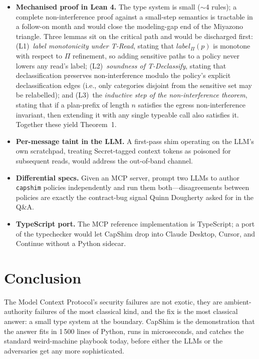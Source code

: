 \documentclass[11pt,a4paper]{article}
\begin{document}
\begin{itemize}[leftmargin=*]
\item \textbf{Mechanised proof in Lean 4.} The type system is small
($\sim$4 rules); a complete non-interference proof against a
small-step semantics is tractable in a follow-on month and would
close the modeling-gap end of the Miyazono triangle. Three lemmas
sit on the critical path and would be discharged first:
(L1)~\emph{label monotonicity under T-Read}, stating that
$\mathit{label}_\Pi(p)$ is monotone with respect to $\Pi$ refinement,
so adding sensitive paths to a policy never lowers any read's label;
(L2)~\emph{soundness of T-Declassify}, stating that declassification
preserves non-interference modulo the policy's explicit
declassification edges (i.e., only categories disjoint from the
sensitive set may be relabelled); and (L3)~the \emph{inductive step
of the non-interference theorem}, stating that if a plan-prefix of
length $n$ satisfies the egress non-interference invariant, then
extending it with any single typeable call also satisfies it.
Together these yield Theorem~1.

\item \textbf{Per-message taint in the LLM.} A first-pass shim
operating on the LLM's own scratchpad, treating Secret-tagged
context tokens as poisoned for subsequent reads, would address the
out-of-band channel.

\item \textbf{Differential specs.} Given an MCP server, prompt two
LLMs to author \texttt{capshim} policies independently and run them
both---disagreements between policies are exactly the contract-bug
signal Quinn Dougherty asked for in the Q\&A.

\item \textbf{TypeScript port.} The MCP reference implementation is
TypeScript; a port of the typechecker would let CapShim drop into
Claude Desktop, Cursor, and Continue without a Python sidecar.
\end{itemize}

\section{Conclusion}

The Model Context Protocol's security failures are not exotic, they
are ambient-authority failures of the most classical kind, and the
fix is the most classical answer: a small type system at the
boundary. CapShim is the demonstration that the answer fits in 1\,500
lines of Python, runs in microseconds, and catches the standard
weird-machine playbook today, before either the LLMs or the
adversaries get any more sophisticated.
\end{document}
